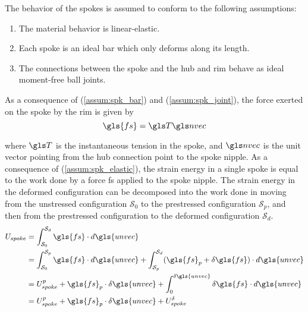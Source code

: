 \documentclass[\rootdir/thesis.tex]{subfiles}
\begin{document}

The behavior of the spokes is assumed to conform to the following assumptions:

\begin{enumerate}
    \item{The material behavior is linear-elastic.}\label{assum:spk_elastic}
    \item{Each spoke is an ideal bar which only deforms along its length.}\label{assum:spk_bar}
    \item{The connections between the spoke and the hub and rim behave as ideal moment-free ball joints.}\label{assum:spk_joint}
\end{enumerate}

As a consequence of (\ref{assum:spk_bar}) and (\ref{assum:spk_joint}), the force exerted on the spoke by the rim is given by
\begin{equation}
\label{eq:spk_force}
\gls{fs} = \T\n
\end{equation}

where $\T$ is the instantaneous tension in the spoke, and $\n$ is the unit vector pointing from the hub connection point to the spoke nipple. As a consequence of (\ref{assum:spk_elastic}), the strain energy in a single spoke is equal to the work done by a force \gls{fs} applied to the spoke nipple. The strain energy in the deformed configuration can be decomposed into the work done in moving from the unstressed configuration $\mathcal{S}_0$ to the prestressed configuration $\mathcal{S}_p$, and then from the prestressed configuration to the deformed configuration $\mathcal{S}_d$.
\begin{align}
\begin{split}
\label{eq:U_spoke}
U_{spoke} &= \int_{\mathcal{S}_0}^{\mathcal{S}_d} \gls{fs} \cdot d\gls{unvec}\\
          &= \int_{\mathcal{S}_0}^{\mathcal{S}_p} \gls{fs} \cdot d\gls{unvec} +
             \int_{\mathcal{S}_p}^{\mathcal{S}_d} (\gls{fs}_p + \delta\gls{fs}) \cdot d\gls{unvec}\\
          &= U_{spoke}^p + \gls{fs}_p \cdot \delta\gls{unvec} +
             \int_{0}^{\delta\gls{unvec}} \delta\gls{fs} \cdot d\gls{unvec}\\
          &= U_{spoke}^p + \gls{fs}_p \cdot \delta\gls{unvec} + U_{spoke}^{\delta}
\end{split}
\end{align}
\end{document}
